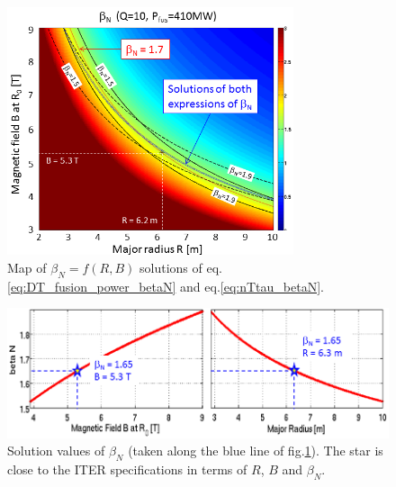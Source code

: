 \begin{figure} 
	\begin{center}
		\includegraphics[width=0.75\textwidth]{figures/Fig_2D_betaN_R_B_ITER_ok.png}
		\caption{Map of $\beta_N=f(R,B)$ solutions of eq.\ref{eq:DT_fusion_power_betaN} and eq.\ref{eq:nTtau_betaN}.}
		\label{fig:solutions_betaN}
	\end{center}
\end{figure}

\begin{figure} 
	\begin{center}
		\includegraphics[width=1.\textwidth]{figures/Fig_betaN_solutions_2graphsRB.png}
		\caption{Solution values of $\beta_N$ (taken along the blue line of fig.\ref{fig:solutions_betaN}). The star is close to the ITER specifications in terms of $R$, $B$ and $\beta_N$.}
		\label{fig:}
	\end{center}
\end{figure}

